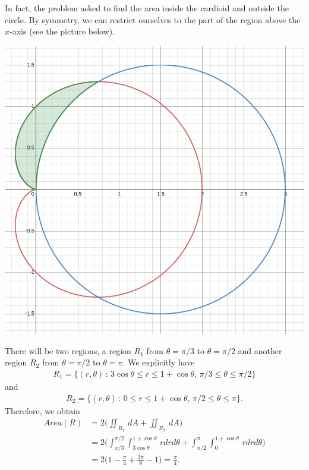 \documentclass[12pt]{article}
\begin{document}
	In fact, the problem asked to find the area inside the cardioid and outside the circle. By symmetry, we can restrict ourselves to the part of the region above the $x$-axis (see the picture below).
	\begin{center}
		\includegraphics[scale=0.3]{exo18_15-3.png}
	\end{center}
	There will be two regions, a region $R_1$ from $\theta = \pi/3$ to $\theta = \pi / 2$ and another region $R_2$ from $\theta = \pi /2$ to $\theta = \pi$. We explicitly have
		\begin{align*}
		R_1 = \{ (r, \theta ) \, : \, 3 \cos \theta \leq r \leq 1 + \cos \theta , \, \pi/3 \leq \theta \leq \pi / 2 \}
		\end{align*} 
	and
		\begin{align*}
		R_2 = \{ (r, \theta ) \, : \, 0 \leq r \leq 1 + \cos \theta , \, \pi / 2 \leq \theta \leq \pi \} .
		\end{align*} 
	Therefore, we obtain
		\begin{align*}
		Area (R) &= 2 \Big( \iint_{R_1} \, dA + \iint_{R_2} \, dA \Big) \\ 
		&= 2 \Big( \int_{\pi / 3}^{\pi /2} \int_{3 \cos \theta}^{1 + \cos \theta} \, r dr d\theta + \int_{\pi/2}^{\pi} \int_{0}^{1 + \cos \theta} \, r dr d\theta \Big) \\ 
		&= 2 \Big( 1 - \frac{\pi}{4} + \frac{3\pi}{8} - 1 \Big) = \frac{\pi}{4} . \tag*{$\triangle$}
		\end{align*} 
\end{document}
